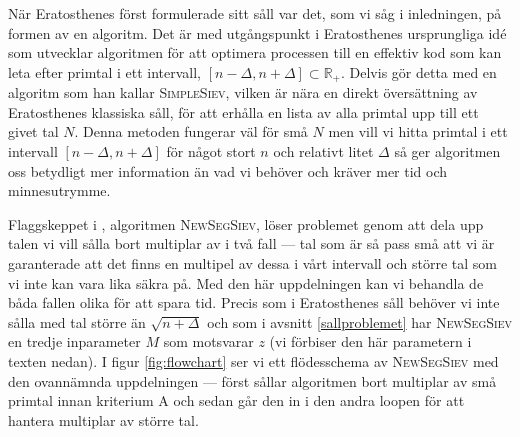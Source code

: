 


När Eratosthenes först formulerade sitt såll var det, som vi såg i inledningen, på formen av en algoritm. Det är med utgångspunkt i Eratosthenes ursprungliga idé som \cite{HaraldSieve} utvecklar algoritmen för att optimera processen till en effektiv kod som kan leta efter primtal i ett intervall, $[n - \Delta, n + \Delta] \subset \mathbb{R}_+$. Delvis gör \cite{HaraldSieve} detta med en algoritm som han kallar \textsc{SimpleSiev}, vilken är nära en direkt översättning av Eratosthenes klassiska såll, för att erhålla en lista av alla primtal upp till ett givet tal $N$. Denna metoden fungerar väl för små $N$ men vill vi hitta primtal i ett intervall $[n - \Delta, n + \Delta]$ för något stort $n$ och relativt litet $\Delta$ så ger algoritmen oss betydligt mer information än vad vi behöver och kräver mer tid och minnesutrymme. 

Flaggskeppet i \cite{HaraldSieve}, algoritmen \textsc{NewSegSiev}, löser problemet genom att dela upp talen vi vill sålla bort multiplar av i två fall --- tal som är så pass små att vi är garanterade att det finns en multipel av dessa i vårt intervall och större tal som vi inte kan vara lika säkra på. Med den här uppdelningen kan vi behandla de båda fallen olika för att spara tid. Precis som i Eratosthenes såll behöver vi inte sålla med tal större än \(\sqrt{n + \Delta}\) och som i avsnitt \ref{sallproblemet} har \textsc{NewSegSiev} en tredje inparameter \(M\) som motsvarar $z$ (vi förbiser den här parametern i texten nedan). I figur \ref{fig:flowchart} ser vi ett flödesschema av \textsc{NewSegSiev} med den ovannämnda uppdelningen --- först sållar algoritmen bort multiplar av små primtal innan kriterium A och sedan går den in i den andra loopen för att hantera multiplar av större tal. 

